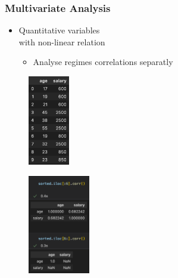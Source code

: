 \begin{frame}\frametitle{Multivariate Analysis}
   \begin{minipage}{0.48\linewidth}
      \begin{itemize}
         \item Quantitative variables\\
               with non-linear relation
         \begin{itemize}
            \item Analyse regimes correlations separatly
         \end{itemize}
      \end{itemize}
      \begin{figure}[H]
         \includegraphics[width=1.8cm]{../images/illustrations/pattern_multivariate_quantitative_non_linear_df.png}
      \end{figure}
   \end{minipage}
   \begin{minipage}{0.48\linewidth}
      \begin{figure}[H]
         \includegraphics[width=2.7cm]{../images/illustrations/pattern_multivariate_quantitative_non_linear_corr_pearson_split.png}
      \end{figure}
   \end{minipage}
\end{frame}





